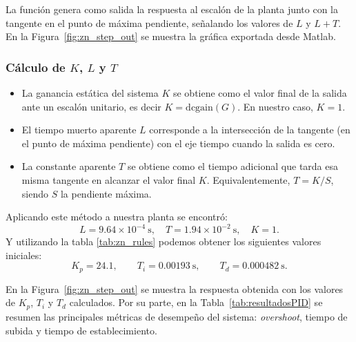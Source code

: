 La función genera como salida la respuesta al escalón de la planta junto con la tangente en el punto de máxima pendiente, señalando los valores de \(L\) y \(L+T\). En la Figura~\ref{fig:zn_step_out} se muestra la gráfica exportada desde Matlab.





\subsubsection*{Cálculo de \(K\), \(L\) y \(T\)}
\begin{itemize}
	\item La ganancia estática del sistema \(K\) se obtiene como el valor final de la salida ante un escalón unitario, es decir \(K = \mathrm{dcgain}(G)\). En nuestro caso, \(K=1\).
	\item El tiempo muerto aparente \(L\) corresponde a la intersección de la tangente (en el punto de máxima pendiente) con el eje tiempo cuando la salida es cero.
	\item La constante aparente \(T\) se obtiene como el tiempo adicional que tarda esa misma tangente en alcanzar el valor final \(K\). Equivalentemente, \(T = K/S\), siendo \(S\) la pendiente máxima.
\end{itemize}

\begin{table}[!t]
	\centering
	\small
	\caption{Reglas de Ziegler--Nichols por respuesta al escalón.}
	\label{tab:zn_rules}
\end{table}

Aplicando este método a nuestra planta se encontró:
\[
L = 9.64 \times 10^{-4}~\text{s}, \quad T = 1.94\times 10^{-2}~\text{s}, \quad K=1.
\]
Y utilizando la tabla \ref{tab:zn_rules} podemos obtener los siguientes valores iniciales:
\[
K_p = 24.1, \qquad T_i = 0.00193~\text{s}, \qquad T_d = 0.000482~\text{s}.
\]

En la Figura~\ref{fig:zn_step_out} se muestra la respuesta obtenida con los valores de $K_p$, $T_i$ y $T_d$ calculados. 
Por su parte, en la Tabla~\ref{tab:resultadosPID} se resumen las principales métricas de desempeño del sistema: \emph{overshoot}, tiempo de subida y tiempo de establecimiento.

